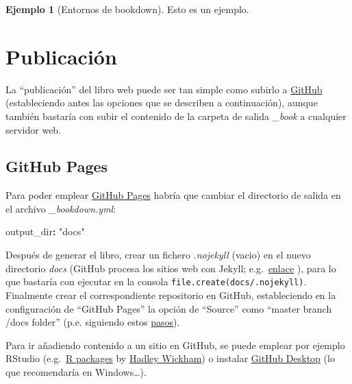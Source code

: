 \documentclass[
]{book}
\newenvironment{Shaded}{\begin{snugshade}}{\end{snugshade}}
\newcommand{\AttributeTok}[1]{\textcolor[rgb]{0.77,0.63,0.00}{#1}}
\newcommand{\FunctionTok}[1]{\textcolor[rgb]{0.00,0.00,0.00}{#1}}
\newcommand{\KeywordTok}[1]{\textcolor[rgb]{0.13,0.29,0.53}{\textbf{#1}}}
\newcommand{\StringTok}[1]{\textcolor[rgb]{0.31,0.60,0.02}{#1}}
\theoremstyle{definition}
\theoremstyle{definition}
\newtheorem{example}{Ejemplo}[chapter]
\theoremstyle{definition}
\theoremstyle{definition}
\theoremstyle{remark}
\begin{document}
\begin{example}[Entornos de bookdown]
\protect\hypertarget{exm:foo}{}\label{exm:foo}Esto es un ejemplo.
\end{example}

\hypertarget{publicaciuxf3n}{%
\chapter{Publicación}\label{publicaciuxf3n}}

La ``publicación'' del libro web puede ser tan simple como subirlo a
\href{https://help.github.com}{GitHub} (estableciendo antes las opciones
que se describen a continuación), aunque también bastaría con subir
el contenido de la carpeta de salida \emph{\_book} a cualquier servidor web.

\hypertarget{github}{%
\section{GitHub Pages}\label{github}}

Para poder emplear \href{https://pages.github.com}{GitHub Pages}
habría que cambiar el directorio de salida en el archivo \emph{\_bookdown.yml}:

\begin{Shaded}
\begin{Highlighting}[]
\FunctionTok{output\_dir}\KeywordTok{:}\AttributeTok{ }\StringTok{"docs"}
\end{Highlighting}
\end{Shaded}

Después de generar el libro, crear un fichero \emph{.nojekyll} (vacio)
en el nuevo directorio \emph{docs}
(GitHub procesa los sitios web con Jekyll;
e.g.~\href{https://help.github.com/articles/using-jekyll-as-a-static-site-generator-with-github-pages}{enlace} ),
para lo que bastaría con ejecutar en la consola \texttt{file.create(\textquotesingle{}docs/.nojekyll\textquotesingle{})}.
Finalmente crear el correspondiente repositorio en GitHub,
estableciendo en la configuración de ``GitHub Pages''
la opción de ``Source'' como ``master branch /docs folder''
(p.e. siguiendo estos \href{https://help.github.com/articles/configuring-a-publishing-source-for-github-pages}{pasos}).

Para ir añadiendo contenido a un sitio en GitHub, se puede emplear por ejemplo RStudio (e.g.~\href{http://r-pkgs.had.co.nz/git.html}{R packages}
by \href{http://hadley.nz/\#code}{Hadley Wickham})
o instalar \href{https://desktop.github.com}{GitHub Desktop}
(lo que recomendaría en Windows\ldots).
\end{document}
